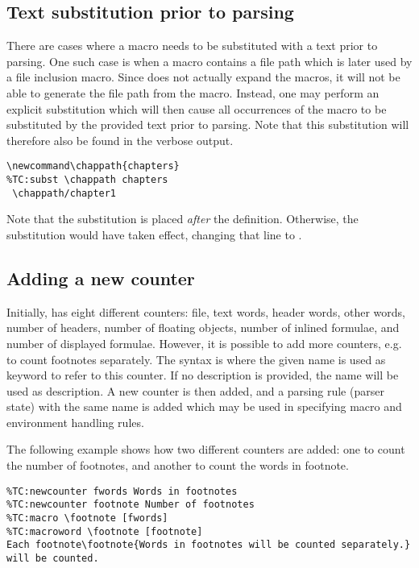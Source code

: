 \documentclass{article}
\begin{document}
\subsection{Text substitution prior to parsing}

There are cases where a macro needs to be substituted with a text prior to parsing. One such case is when a macro contains a file path which is later used by a file inclusion macro. Since \TeXcount{} does not actually expand the macros, it will not be able to generate the file path from the macro. Instead, one may perform an explicit substitution
which will then cause all occurrences of the macro to be substituted by the provided text prior to parsing. Note that this substitution will therefore also be found in the verbose output. 

\begin{lstlisting}
\newcommand\chappath{chapters}
%TC:subst \chappath chapters
 \chappath/chapter1
\end{lstlisting}

Note that the substitution is placed \emph{after} the  definition. Otherwise, the substitution would have taken effect, changing that line to .



\subsection{Adding a new counter}

Initially, \TeXcount{} has eight different counters: file, text words, header words, other words, number of headers, number of floating objects, number of inlined formulae, and number of displayed formulae. However, it is possible to add more counters, e.g. to count footnotes separately. The syntax is
where the given name is used as keyword to refer to this counter. If no description is provided, the name will be used as description. A new counter is then added, and a parsing rule (parser state) with the same name is added which may be used in specifying macro and environment handling rules.

The following example shows how two different counters are added: one to count the number of footnotes, and another to count the words in footnote.

\begin{lstlisting}
%TC:newcounter fwords Words in footnotes
%TC:newcounter footnote Number of footnotes
%TC:macro \footnote [fwords]
%TC:macroword \footnote [footnote]
Each footnote\footnote{Words in footnotes will be counted separately.} will be counted.
\end{lstlisting}
\end{document}
